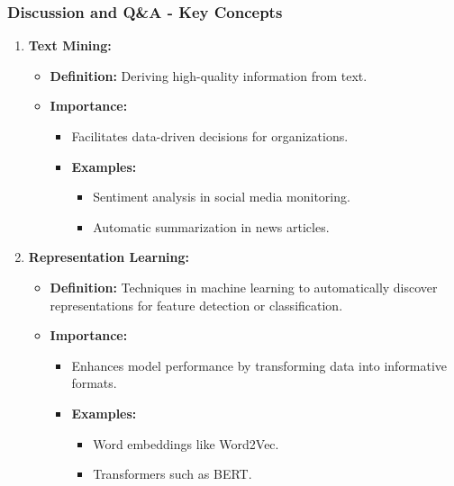 \documentclass[aspectratio=169]{beamer}
\begin{document}
\begin{frame}[fragile]
  \frametitle{Discussion and Q\&A - Key Concepts}
  \begin{enumerate}
    \item \textbf{Text Mining:}
      \begin{itemize}
        \item \textbf{Definition:} Deriving high-quality information from text.
        \item \textbf{Importance:}
          \begin{itemize}
            \item Facilitates data-driven decisions for organizations.
            \item \textbf{Examples:}
              \begin{itemize}
                \item Sentiment analysis in social media monitoring.
                \item Automatic summarization in news articles.
              \end{itemize}
          \end{itemize}
      \end{itemize}
    
    \item \textbf{Representation Learning:}
      \begin{itemize}
        \item \textbf{Definition:} Techniques in machine learning to automatically discover representations for feature detection or classification.
        \item \textbf{Importance:}
          \begin{itemize}
            \item Enhances model performance by transforming data into informative formats.
            \item \textbf{Examples:}
              \begin{itemize}
                \item Word embeddings like Word2Vec.
                \item Transformers such as BERT.
              \end{itemize}
          \end{itemize}
      \end{itemize}
  \end{enumerate}
\end{frame}
\end{document}
